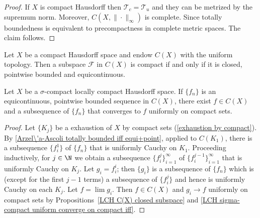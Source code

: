 \begin{proof}
If $X$ is compact Hausdorff then $\mathcal{T}_c=\mathcal{T}_u$ and they can be metrized by the supremum norm. Moreover, $C(X,\|\cdot\|_\infty)$ is complete. Since totally boundedness is equivalent to precompactness in complete metric spaces. The claim follows.
\end{proof}
\begin{corollary}\label{Arzela-Ascoli compact iff}
Let $X$ be a compact Hausdorff space and endow $C(X)$ with the uniform topology. Then a subspace $\mathscr{F}$ in $C(X)$ is compact if and only if it is closed, pointwise bounded and equicontinuous.
\end{corollary}
\begin{proposition}\label{Arzela-Ascoli convergent subsequence}
Let $X$ be a $\sigma$-compact locally compact Hausdorff space. If $\{f_n\}$ is an equicontinuous, pointwise bounded sequence in $C(X)$, there exist $f\in C(X)$ and a subsequence of $\{f_n\}$ that converges to $f$ uniformly on compact sets.
\end{proposition}
\begin{proof}
Let $\{K_j\}$ be a exhaustion of $X$ by compact sets (\cref{exhaustion by compact}). By \cref{Arzel\'a-Ascoli totally bounded iff equi+point}, applied to $C(K_1)$, there is a subsequence $\{f_i^1\}$ of $\{f_n\}$ that is uniformly Cauchy on $K_1$. Proceeding inductively, for $j\in\N$ we obtain a subsequence $\{f_i^j\}_{i=1}^{\infty}$ of $\{f_i^{j-1}\}_{i=1}^{\infty}$ that is uniformly Cauchy on $K_j$. Let $g_i=f_i^i$; then $\{g_i\}$ is a subsequence of $\{f_n\}$ which is (except for the first $j-1$ terms) a subsequence of $\{f_i^j\}$ and hence is uniformly Cauchy on each $K_j$. Let $f=\lim g_i$. Then $f\in C(X)$ and $g_i\to f$ uniformly on compact sets by Propositions~\ref{LCH C(X) closed subspace} and \ref{LCH sigma-compact uniform converge on compact iff}.
\end{proof}
